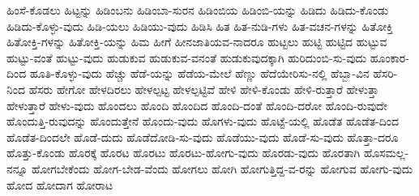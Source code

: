 {ಹಿಂಸೆ-ಕೊಡಲು
ಹಿಟ್ಟನ್ನು
ಹಿಡಿಂಬನು
ಹಿಡಿಂಬಾ-ಸುರನ
ಹಿಡಿಂಬಿಯ
ಹಿಡಿಂಬಿ-ಯನ್ನು
ಹಿಡಿದು
ಹಿಡಿದು-ಕೊಂಡು
ಹಿಡಿದು-ಕೊಳ್ಳು-ವುದು
ಹಿಡಿ-ಯಲು
ಹಿಡಿಯು-ವುದು
ಹಿಡಿಸಿ
ಹಿತ
ಹಿತ-ನುಡಿ-ಗಳು
ಹಿತ-ವಚನ-ಗಳನ್ನು
ಹಿತೋಕ್ತಿ
ಹಿತೋಕ್ತಿ-ಗಳನ್ನು
ಹಿತೋಕ್ತಿ-ಯನ್ನು
ಹಿಮ
ಹೀಗೆ
ಹೀನಜಾತಿಯವ-ನಾದರೂ
ಹುಟ್ಟಲು
ಹುಟ್ಟಿ
ಹುಟ್ಟಿದ
ಹುಟ್ಟುವ
ಹುಟ್ಟು-ವಂತೆ
ಹುಟ್ಟು-ವುದು
ಹುಡುಕುವ
ಹುಡುಕುವ-ವನಂತೆ
ಹುಡುಕುವುದಕ್ಕಾಗಿ
ಹುರಿದುಂಬಿ-ಸು-ವುದು
ಹೂಂಕಾರ-ದಿಂದ
ಹೂತಿ-ಕೊಳ್ಳು-ವುದು
ಹೆಚ್ಚು
ಹೆಡೆ-ಯನ್ನು
ಹೆಡೆಯ-ಮೇಲೆ
ಹೆಣ್ಣು
ಹೆದೆಯೇರಿಸು-ನಲ್ಲಿ
ಹೆಬ್ಬಾ-ವಿನ
ಹೆಸರಿ-ನಿಂದ
ಹೆಸರು
ಹೇಗೋ
ಹೇಳದಿರಲು
ಹೇಳಲ್ಪಟ್ಟ
ಹೇಳಲ್ಪಟ್ಟಿವೆ
ಹೇಳಿ
ಹೇಳಿ-ಕೊಂಡು
ಹೇಳಿ-ರುತ್ತಾರೆ
ಹೇಳುತ್ತಾ
ಹೇಳುತ್ತಾರೆ
ಹೇಳು-ವುದು
ಹೊಂದಲು
ಹೊಂದಿ
ಹೊಂದಿದ
ಹೊಂದಿ-ದಂತೆ
ಹೊಂದಿ-ದರೋ
ಹೊಂದಿ-ರುವುದೇ
ಹೊಂದುತ್ತಿ-ರುವುದನ್ನು
ಹೊಂದುತ್ತೇನೆ
ಹೊಂದು-ವುದು
ಹೊಗಳು-ವುದು
ಹೊಟ್ಟೆ-ಯಲ್ಲಿ
ಹೊಡೆತ
ಹೊಡೆತ-ದಿಂದ
ಹೊಡೆತ-ದಿಂದಲೇ
ಹೊಡೆ-ದುದು
ಹೊಡೆದೋಡಿ-ಸು-ವುದು
ಹೊಡೆಯು-ವುದು
ಹೊಡೆ-ಸು-ವುದು
ಹೊತ್ತಾ-ದರೂ
ಹೊತ್ತು-ಕೊಂಡು
ಹೊರಕ್ಕೆ
ಹೊರಟ
ಹೊರಟು
ಹೊರಟು-ಹೋಗು-ವುದು
ಹೊರಡು-ವುದು
ಹೊರತಾಗಿ
ಹೊಸಮಲ್ಲ-ನನ್ನೂ
ಹೋಗಬೇಕೆಂದು
ಹೋಗ-ಬೇಡ-ವೆಂದು
ಹೋಗಲು
ಹೋಗಿ
ಹೋಗುತ್ತಿದ್ದ-ವ-ರನ್ನು
ಹೋಗುವ
ಹೋಗು-ವುದು
ಹೋದ
ಹೋದಾಗ
ಹೋರಾಟ
}
